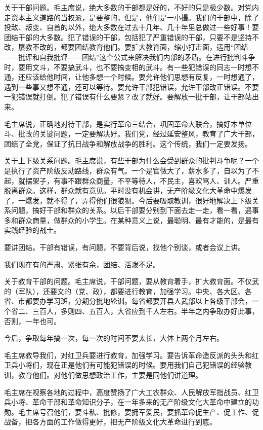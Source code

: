 关于干部问题。毛主席说，绝大多数的干部都是好的，不好的只是极少数。对党内走资本主义道路的当权派，是要整的，但是，他们是一小撮。我们的干部中，除了投敌、叛变、自首的以外，绝大多数在过去十几年、几十年里总做过一些好事！要团结干部的大多数。犯了错误的干部，包括犯了严重错误的干部，只要不是坚持不改，屡教不改的，都要团结教育他们。要扩大教育面，缩小打击面，运用“团结——批评和自我批评——团结”这个公式来解决我们内部的矛盾。在进行批判斗争时，要用文斗，不要搞武斗，也不要搞变相的武斗。有一些犯错误的同志一时想不通，还应该给他时间，让他多想一个时候。要允许他们思想有反复，一时想通了，遇到一些事又想不通，还可以等待。要允许干部犯错误，允许干部改正错误。不要一犯错误就打倒。犯了错误有什么要紧？改了就好。要解放一批干部，让干部站出来。

毛主席说，正确地对待干部，是实行革命三结合，巩固革命大联合，搞好本单位斗、批改的关键问题，一定要解决好。我们党，经过延安整风，教育了广大干部，团结了全党，保证了抗日战争和解放战争的胜利。这个传统，我们一定要发扬。

关于上下级关系问题。毛主席说，有些干部为什么会受到群众的批判斗争呢？一个是执行了资产阶级反动路线，群众有气。一个是官做大了，薪水多了，自以为了不起，就摆架子，有事不跟群众商量，不平等待人，不民主，喜欢骂人、训人。严重脱离群众。这样，群众就有意见。平时没有机会讲，无产阶级文化大革命中爆发了，一爆发，就不得了，弄得他们很狼狈。今后要吸取教训，很好地解决上下级关系问题，搞好干部和群众的关系。以后干部要分别到下面去走一走，看一看，遇事多和群众商量，做群众的小学生。在某种意义上说，最聪明、最有才能的，是最有实践经验的战士。

要讲团结。干部有错误，有问题，不要背后说，找他个别谈，或者会议上讲。

我们现在有的严肃、紧张有余，团结、活泼不足。

关于教育干部的问题。毛主席说，干部问题，要从教育着手，扩大教育面。不仅武的（军队），还要文的（党、政），都要进行教育，加强学习。中央、各大区、各省、市都要办学习斑，分期分批地轮训。每省都要开县人武部以上各级干部会，一个省二、三百人，多则四、五百人，大省应到千人左右。半年之内争取办好此事，否则，一年也可。

今后，争取每年搞一次，每一次的时间不要太长，大体上两个月左右。

毛主席教导我们，对红卫兵要进行教育，加强学习。要告诉革命造反派的头头和红卫兵小将们，现在正是他们有可能犯错误的时候。要用我们自己犯错误的经验教训，教育他们。对他们做思想政治工作，主要是同他们讲道理。

毛主席在视察各地的过程中，高度赞扬了广大工农群众、人民解放军指战员、红卫兵小将、革命干部和革命知识分子，在一年多来的无产阶级文化大革命中建立的功勋。毛主席号召他们，要斗私、批修，要拥军爱民，要抓革命促生产、促工作、促战备，把各方面的工作做得更好，把无产阶级文化大革命进行到底。

